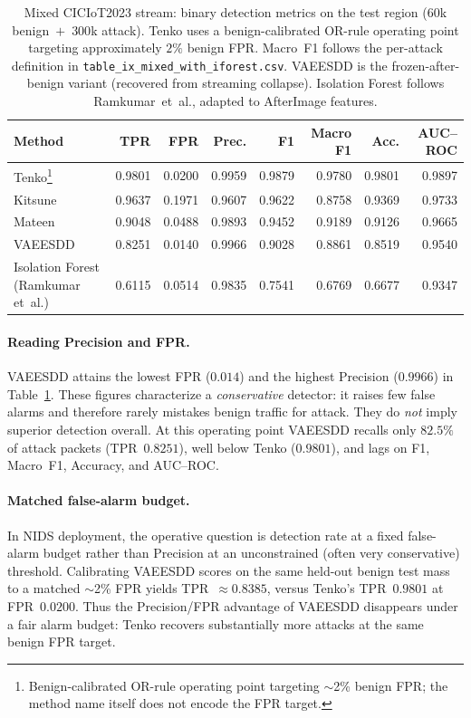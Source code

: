 \begin{table}[t]
\centering
\caption{Mixed CICIoT2023 stream: binary detection metrics on the test region
($60$k benign~$+$~$300$k attack).
Tenko uses a benign-calibrated OR-rule operating point targeting approximately
$2\%$ benign FPR.
Macro~F1 follows the per-attack definition in
\texttt{table\_ix\_mixed\_with\_iforest.csv}.
VAEESDD is the frozen-after-benign variant (recovered from streaming collapse).
Isolation Forest follows Ramkumar~et~al., adapted to AfterImage features.}
\label{tab:cic-mixed-baselines}
\setlength{\tabcolsep}{4pt}
\begin{tabular}{@{}lrrrrrrr@{}}
\toprule
Method & TPR & FPR & Prec. & F1 & Macro F1 & Acc. & AUC--ROC \\
\midrule
Tenko\footnote{Benign-calibrated OR-rule operating point targeting $\sim$2\% benign FPR; the method name itself does not encode the FPR target.}
  & 0.9801 & 0.0200 & 0.9959 & 0.9879 & 0.9780 & 0.9801 & 0.9897 \\
Kitsune
  & 0.9637 & 0.1971 & 0.9607 & 0.9622 & 0.8758 & 0.9369 & 0.9733 \\
Mateen
  & 0.9048 & 0.0488 & 0.9893 & 0.9452 & 0.9189 & 0.9126 & 0.9665 \\
VAEESDD
  & 0.8251 & 0.0140 & 0.9966 & 0.9028 & 0.8861 & 0.8519 & 0.9540 \\
Isolation Forest (Ramkumar et~al.)
  & 0.6115 & 0.0514 & 0.9835 & 0.7541 & 0.6769 & 0.6677 & 0.9347 \\
\bottomrule
\end{tabular}
\end{table}

\paragraph{Reading Precision and FPR.}
VAEESDD attains the lowest FPR ($0.014$) and the highest Precision ($0.9966$) in
Table~\ref{tab:cic-mixed-baselines}.
These figures characterize a \emph{conservative} detector: it raises few false
alarms and therefore rarely mistakes benign traffic for attack.
They do \emph{not} imply superior detection overall.
At this operating point VAEESDD recalls only $82.5\%$ of attack packets
(TPR~$0.8251$), well below Tenko ($0.9801$), and lags on F1, Macro~F1,
Accuracy, and AUC--ROC.

\paragraph{Matched false-alarm budget.}
In NIDS deployment, the operative question is detection rate at a fixed false-alarm
budget rather than Precision at an unconstrained (often very conservative) threshold.
Calibrating VAEESDD scores on the same held-out benign test mass to a matched
$\sim$2\% FPR yields TPR~$\approx 0.8385$, versus Tenko's TPR~$0.9801$ at FPR~$0.0200$.
Thus the Precision/FPR advantage of VAEESDD disappears under a fair alarm budget:
Tenko recovers substantially more attacks at the same benign FPR target.

